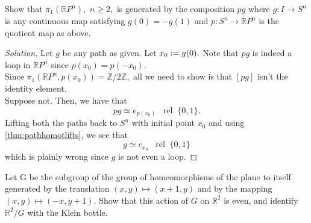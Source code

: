 \documentclass[12pt]{article}
\newcommand{\rel}{\;\;\operatorname{rel}\;}
\newenvironment{soln}{\begin{proof}[Solution]}{\end{proof}}
\begin{document}
\begin{exe}
	Show that $\pi_1(\mathbb{R}P^n),$ $n \ge 2,$ is generated by the composition $pg$ where $g : I \to S^n$ is any continuous map satisfying $g(0) = -g(1)$ and $p: S^n \to \mathbb{R}P^n$ is the quotient map as above.
\end{exe}
\begin{soln}
	Let $g$ be any path as given. Let $x_0 \vcentcolon= g(0).$ Note that $pg$ is indeed a loop in $\mathbb{R}P^n$ since $p(x_0) = p(-x_0).$\\
	Since $\pi_1(\mathbb{R}P^n, p(x_0)) = \mathbb{Z}/2\mathbb{Z},$ all we need to show is that $[pg]$ isn't the identity element.\\
	Suppose not. Then, we have that
	\begin{equation*} 
		pg \simeq e_{p(x_0)} \rel \{0, 1\}.
	\end{equation*}
	Lifting both the paths back to $S^n$ with initial point $x_0$ and using \cref{thm:pathhomotlifts}, we see that
	\begin{equation*} 
		g \simeq e_{x_0} \rel\{0, 1\}
	\end{equation*}
	which is plainly wrong since $g$ is not even a loop.
\end{soln}
%
%
%
\begin{exe}
	Let G be the subgroup of the group of homeomorphisms of the plane to itself generated by the translation $(x, y) \mapsto (x + 1, y)$ and by the mapping $(x, y) \mapsto (-x, y + 1).$ Show that this action of $G$ on $\mathbb{R}^2$ is even, and identify $\mathbb{R}^2/G$ with the Klein bottle.
\end{exe}
\end{document}
